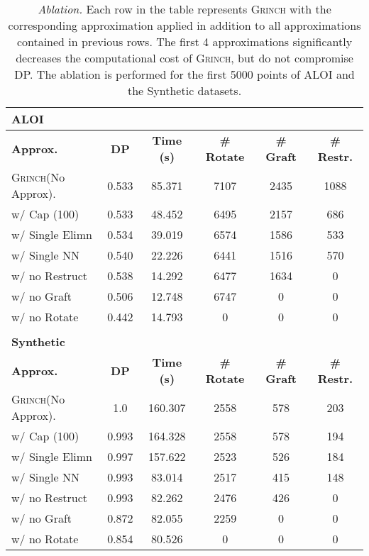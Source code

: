 \documentclass{article} \usepackage[utf8]{inputenc} \usepackage[T1]{fontenc}    \usepackage{hyperref}       \usepackage{url}            \usepackage{booktabs}       \usepackage{amsfonts}       \usepackage{nicefrac}       \usepackage{microtype}      \usepackage{geometry}
\newcommand{\alg}{\textsc{Grinch}\xspace}
\begin{document}
\begin{table}
  \centering
  \begin{tabular}{l c c c c c}
    \textbf{ALOI}\\
    \hline
\textbf{Approx.}    & \textbf{DP} & \textbf{Time (s) } & \textbf{\# Rotate} & \textbf{\# Graft} & \textbf{\# Restr.} \\
    \alg (No Approx).  & 0.533       &	85.371             &	7107             &	2435          &	1088             \\
\hspace{.2cm} w/ Cap (100) & 0.533 &	48.452 & 	6495 &	2157 &	686 \\
\hspace{.2cm} w/ Single Elimn & 0.534 &	39.019 &	6574 &	1586 &	533 \\
\hspace{.2cm} w/ Single NN &0.540 &	22.226 &	6441 &	1516 &	570 \\
\hspace{.2cm} w/ no Restruct &0.538 &	14.292 &	6477 &	1634 &	0   \\
\hspace{.2cm} w/ no Graft & 0.506 &	12.748 &	6747 &	0 &	0   \\
\hspace{.2cm} w/ no Rotate & 0.442 &	14.793 &	0 &	0 &	0   \\
    \\
    \textbf{Synthetic}\\
    \hline
\textbf{Approx.} & \textbf{DP} & \textbf{Time (s) } & \textbf{\# Rotate} & \textbf{\# Graft} & \textbf{\# Restr.}\\
    \alg (No Approx).  & 1.0         & 160.307              & 2558                & 578   &  203\\
\hspace{.2cm} w/ Cap (100) & 0.993 & 164.328 & 2558 & 578 & 194\\
\hspace{.2cm} w/ Single Elimn & 0.997 & 157.622 & 2523 & 526 & 184\\
\hspace{.2cm} w/ Single NN & 0.993 & 83.014 & 2517 & 415 & 148\\
\hspace{.2cm} w/ no Restruct & 0.993 & 82.262 & 2476 & 426 &  0\\
\hspace{.2cm} w/ no Graft & 0.872 & 82.055 & 2259 & 0   &  0\\
\hspace{.2cm} w/ no Rotate & 0.854 & 80.526 & 0 & 0 & 0\\

    \hline
  \end{tabular}
\caption{\emph{Ablation.} Each row in the table represents \alg with
  the corresponding approximation applied in addition to all
  approximations contained in previous rows. The first 4
  approximations significantly decreases the computational cost of
  \alg, but do not compromise DP. The ablation is performed for the
  first 5000 points of ALOI and the Synthetic datasets.}
\label{fig:approx_tbl2}
\end{table}
 
\end{document}
